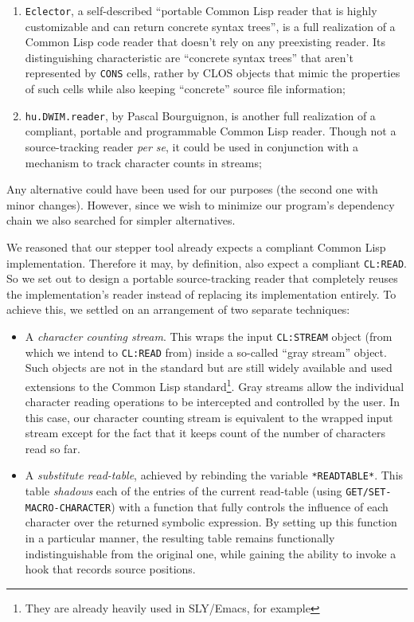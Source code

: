 \documentclass[sigconf]{acmart}
\begin{document}
\begin{enumerate}
\item \texttt{Eclector}\cite{eclector}, a self-described ``portable
  Common Lisp reader that is highly customizable and can return
  concrete syntax trees'', is a full realization of a Common Lisp code
  reader that doesn't rely on any preexisting reader.  Its
  distinguishing characteristic are ``concrete syntax trees'' that
  aren't represented by \texttt{CONS} cells, rather by CLOS objects
  that mimic the properties of such cells while also keeping
  ``concrete'' source file information;

\item \texttt{hu.DWIM.reader}\cite{bourguignon-reader}, by Pascal
  Bourguignon, is another full realization of a compliant, portable
  and programmable Common Lisp reader.  Though not a source-tracking
  reader \emph{per se}, it could be used in conjunction with a
  mechanism to track character counts in streams;
\end{enumerate}

Any alternative could have been used for our purposes (the second one
with minor changes).  However, since we wish to minimize our program's
dependency chain we also searched for simpler alternatives.

We reasoned that our stepper tool already expects a compliant Common
Lisp implementation.  Therefore it may, by definition, also expect a
compliant \texttt{CL:READ}.  So we set out to design a portable
source-tracking reader that completely reuses the implementation's
reader instead of replacing its implementation entirely.  To achieve
this, we settled on an arrangement of two separate techniques:

\begin{itemize}
\item A \emph{character counting stream}.  This wraps the input
  \texttt{CL:STREAM} object (from which we intend to \texttt{CL:READ}
  from) inside a so-called ``gray stream'' object.  Such objects are
  not in the standard but are still widely available and used
  extensions to the Common Lisp standard\footnote{They are already
    heavily used in SLY/Emacs, for example}.  Gray streams allow the
  individual character reading operations to be intercepted and
  controlled by the user.  In this case, our character counting stream
  is equivalent to the wrapped input stream except for the fact that
  it keeps count of the number of characters read so far.
  
\item A \emph{substitute read-table}, achieved by rebinding the
  variable \texttt{*READTABLE*}.  This table \emph{shadows} each of
  the entries of the current read-table (using
  \texttt{GET/SET-MACRO-CHARACTER}) with a function that fully
  controls the influence of each character over the returned symbolic
  expression.  By setting up this function in a particular manner, the
  resulting table remains functionally indistinguishable from the
  original one, while gaining the ability to invoke a hook that
  records source positions.
\end{itemize}
\end{document}
